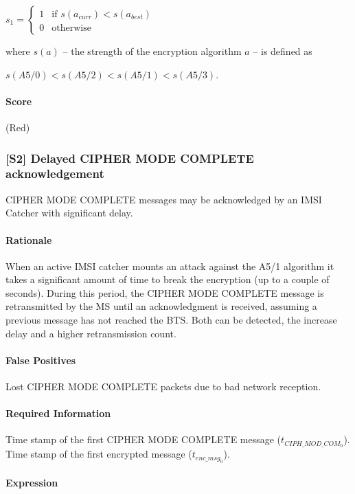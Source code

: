 \documentclass[a4paper,11pt,notitlepage,bigheadings,oneside]{scrartcl}
\begin{document}
$s_1 =
\begin{cases}
	1 & \text{if } s(a_{curr}) < s(a_{best}) \\
	0 & \text{otherwise}
\end{cases}$

where $s(a)$ -- the strength of the encryption algorithm $a$ -- is defined as

$s(A5/0) < s(A5/2) < s(A5/1) < s(A5/3)$.

\paragraph{Score}

\TBD{} (Red)

\subsubsection{[S2] Delayed CIPHER MODE COMPLETE acknowledgement}

CIPHER MODE COMPLETE messages may be acknowledged by an IMSI Catcher with
significant delay.

\paragraph{Rationale}

When an active IMSI catcher mounts an attack against the A5/1 algorithm it
takes a significant amount of time to break the encryption (up to a couple of
seconds). During this period, the CIPHER MODE COMPLETE message is retransmitted
by the MS until an acknowledgment is received, assuming a previous message has
not reached the BTS. Both can be detected, the increase delay and a higher
retransmission count.

\paragraph{False Positives}

Lost CIPHER MODE COMPLETE packets due to bad network reception.

\paragraph{Required Information}

Time stamp of the first CIPHER MODE COMPLETE message ($t_{CIPH\_MOD\_COM_0}$).
Time stamp of the first encrypted message ($t_{enc\_msg_0}$).

\paragraph{Expression}
\end{document}

